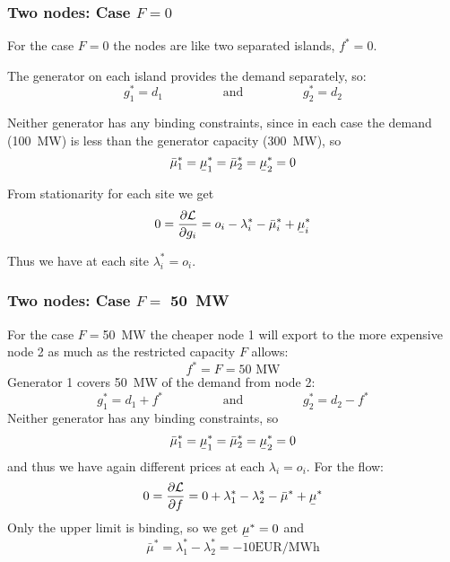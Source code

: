 \documentclass[10pt,dvipsnames]{beamer}
\def\l{\lambda}
\def\m{\mu}
\def\d{\partial}
\def\cL{\mathcal{L}}
\newcommand{\ubar}[1]{\text{\b{$#1$}}}
\begin{document}
\begin{frame}[fragile]
  \frametitle{Two nodes: Case $F = 0$ }

  For the case $F = 0$ the nodes are like two separated islands, $f^* = 0$.

  The generator on each island provides the demand separately, so:
  \begin{equation*}
    g_1^* = d_1  \hspace{2cm} \textrm{and} \hspace{2cm} g_2^* = d_2
  \end{equation*}

  Neither generator has any binding constraints, since in each case the demand (100~MW) is less than the generator capacity (300~MW), so
  \begin{equation*}
    \bar{\m}_1^* = \ubar{\m}_1^* =     \bar{\m}_2^* = \ubar{\m}_2^* = 0
  \end{equation*}

  From stationarity for each site we get
  \begin{equation*}
    0 = \frac{\d \cL}{\d g_{i}} = o_i - \l_i^*  -  \bar{\m}_i^* + \ubar{\m}_i^*
  \end{equation*}

  Thus we have at each site $\l_i^* = o_i$.


\end{frame}


\begin{frame}[fragile]
  \frametitle{Two nodes: Case $F =$ 50~MW }

  For the case $F = $50~MW the cheaper node 1 will export to the more
  expensive node 2 as much as the restricted capacity $F$ allows:
  \begin{equation*}
    f^* = F = 50\textrm{ MW}
  \end{equation*}
  Generator 1 covers 50~MW of the demand from node 2:
  \begin{equation*}
    g_1^* = d_1+f^*  \hspace{2cm} \textrm{and} \hspace{2cm} g_2^* = d_2 - f^*
  \end{equation*}
  Neither generator has any binding constraints, so
  \begin{equation*}
    \bar{\m}_1^* = \ubar{\m}_1^* =     \bar{\m}_2^* = \ubar{\m}_2^* = 0
  \end{equation*}
  and thus we have again different prices at each $\l_i = o_i$. For the flow:
  \begin{equation*}
    0 = \frac{\d \cL}{\d f} = 0 +  \l_1^* - \l_2^*  -  \bar{\m}^* + \ubar{\m}^*
  \end{equation*}
  Only the upper limit is binding, so we get $\ubar{\m}^* = 0$ and
  \begin{equation*}
    \bar{\m}^* = \l_1^* - \l_2^* = -10 \textrm{EUR/MWh}
  \end{equation*}


\end{frame}
\end{document}
